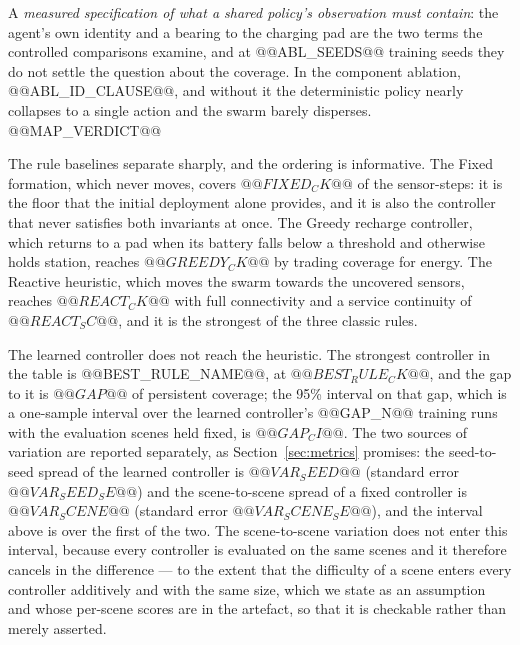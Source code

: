 
    \item A \emph{measured specification of what a shared policy's observation must contain}: the agent's own identity and a bearing to the charging pad are the two terms the controlled comparisons examine, and at @@ABL_SEEDS@@ training seeds they do not settle the question about the coverage.  In the component ablation, @@ABL_ID_CLAUSE@@, and without it the deterministic policy nearly collapses to a single action and the swarm barely disperses.  @@MAP_VERDICT@@


The rule baselines separate sharply, and the ordering is informative.  The
Fixed formation, which never moves, covers $@@FIXED_CK@@$ of the sensor-steps:
it is the floor that the initial deployment alone provides, and it is also
the controller that never satisfies both invariants at once.  The Greedy
recharge controller, which returns to a pad when its battery falls below a
threshold and otherwise holds station, reaches $@@GREEDY_CK@@$ by trading
coverage for energy.  The Reactive heuristic, which moves the swarm towards
the uncovered sensors, reaches $@@REACT_CK@@$ with full connectivity and a
service continuity of $@@REACT_SC@@$, and it is the strongest of the three
classic rules.

The learned controller does not reach the heuristic.  The strongest
controller in the table is @@BEST_RULE_NAME@@, at $@@BEST_RULE_CK@@$, and
the gap to it is $@@GAP@@$ of persistent coverage; the 95\% interval on
that gap, which is a one-sample interval over the learned controller's
@@GAP_N@@ training runs with the evaluation scenes held fixed, is
$@@GAP_CI@@$.  The two sources of variation are reported separately, as
Section~\ref{sec:metrics} promises: the seed-to-seed spread of the
learned controller is $@@VAR_SEED@@$ (standard error $@@VAR_SEED_SE@@$) and
the scene-to-scene spread of a fixed controller is $@@VAR_SCENE@@$ (standard
error $@@VAR_SCENE_SE@@$), and the interval above is over the first of the
two.  The scene-to-scene variation does not enter this
interval, because every controller is evaluated on the same scenes and it
therefore cancels in the difference --- to the extent that the difficulty
of a scene enters every controller additively and with the same size,
which we state as an assumption and whose per-scene scores are in the
artefact, so that it is checkable rather than merely asserted.

